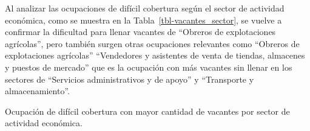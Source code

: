 \documentclass[
  14pt,
]{article}
\begin{document}
\begin{table}
{}

\end{table}%

Al analizar las ocupaciones de difícil cobertura según el sector de
actividad económica, como se muestra en la
Tabla~\ref{tbl-vacantes_sector}, se vuelve a confirmar la dificultad
para llenar vacantes de ``Obreros de explotaciones agrícolas'', pero
también surgen otras ocupaciones relevantes como ``Obreros de
explotaciones agrícolas'' ``Vendedores y asistentes de venta de tiendas,
almacenes y puestos de mercado'' que es la ocupación con más vacantes
sin llenar en los sectores de ``Servicios administrativos y de apoyo'' y
``Transporte y almacenamiento''.

\begin{table}

\caption{\label{tbl-vacantes_sector}Ocupación de difícil cobertura con
mayor cantidad de vacantes por sector de actividad económica.}

\centering{

}
\end{table}
\end{document}
